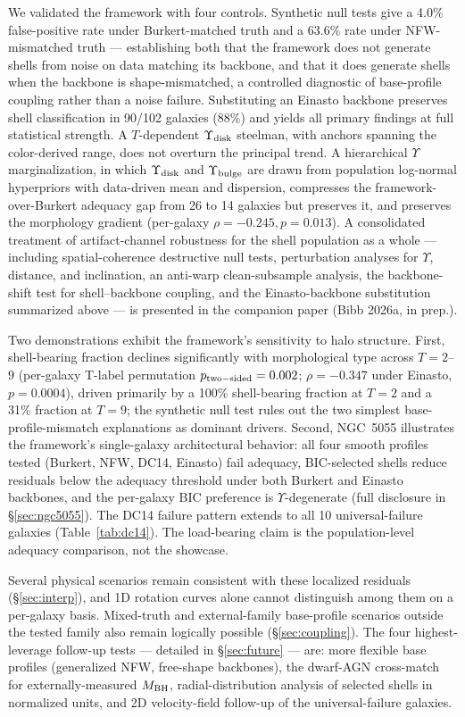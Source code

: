 \documentclass[linenumbers]{aastex701}
\newcommand{\Yt}{\Upsilon}
\newcommand{\Ydisk}{\Upsilon_{\rm disk}}
\newcommand{\Ybulge}{\Upsilon_{\rm bulge}}
\begin{document}
We validated the framework with four controls. Synthetic null tests give a 4.0\% false-positive rate under Burkert-matched truth and a 63.6\% rate under NFW-mismatched truth --- establishing both that the framework does not generate shells from noise on data matching its backbone, and that it does generate shells when the backbone is shape-mismatched, a controlled diagnostic of base-profile coupling rather than a noise failure. Substituting an Einasto backbone preserves shell classification in 90/102 galaxies (88\%) and yields all primary findings at full statistical strength. A $T$-dependent $\Ydisk$ steelman, with anchors spanning the \citet{Schombert2022} color-derived range, does not overturn the principal trend. A hierarchical $\Yt$ marginalization, in which $\Ydisk$ and $\Ybulge$ are drawn from population log-normal hyperpriors with data-driven mean and dispersion, compresses the framework-over-Burkert adequacy gap from 26 to 14 galaxies but preserves it, and preserves the morphology gradient (per-galaxy $\rho = -0.245, p = 0.013$). A consolidated treatment of artifact-channel robustness for the shell population as a whole --- including spatial-coherence destructive null tests, perturbation analyses for $\Yt$, distance, and inclination, an anti-warp clean-subsample analysis, the backbone-shift test for shell--backbone coupling, and the Einasto-backbone substitution summarized above --- is presented in the companion paper (Bibb 2026a, in prep.).

Two demonstrations exhibit the framework's sensitivity to halo structure. First, shell-bearing fraction declines significantly with morphological type across $T=2$--$9$ (per-galaxy T-label permutation $p_{\rm two-sided} = 0.002$; $\rho = -0.347$ under Einasto, $p = 0.0004$), driven primarily by a 100\% shell-bearing fraction at $T=2$ and a 31\% fraction at $T=9$; the synthetic null test rules out the two simplest base-profile-mismatch explanations as dominant drivers. Second, NGC~5055 illustrates the framework's single-galaxy architectural behavior: all four smooth profiles tested (Burkert, NFW, DC14, Einasto) fail adequacy, BIC-selected shells reduce residuals below the adequacy threshold under both Burkert and Einasto backbones, and the per-galaxy BIC preference is $\Yt$-degenerate (full disclosure in \S\ref{sec:ngc5055}). The DC14 failure pattern extends to all 10 universal-failure galaxies (Table~\ref{tab:dc14}). The load-bearing claim is the population-level adequacy comparison, not the showcase.

Several physical scenarios remain consistent with these localized residuals (\S\ref{sec:interp}), and 1D rotation curves alone cannot distinguish among them on a per-galaxy basis. Mixed-truth and external-family base-profile scenarios outside the tested family also remain logically possible (\S\ref{sec:coupling}). The four highest-leverage follow-up tests --- detailed in \S\ref{sec:future} --- are: more flexible base profiles (generalized NFW, free-shape backbones), the \citet{Reines2013} dwarf-AGN cross-match for externally-measured $M_{\rm BH}$, radial-distribution analysis of selected shells in normalized units, and 2D velocity-field follow-up of the universal-failure galaxies.
\end{document}
